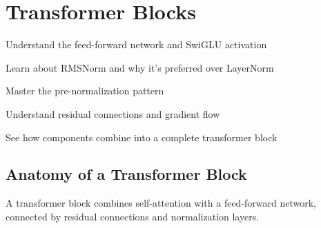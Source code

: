 \chapter{Transformer Blocks}
\label{ch:transformer-blocks}

\begin{objectives}
    \item Understand the feed-forward network and SwiGLU activation
    \item Learn about RMSNorm and why it's preferred over LayerNorm
    \item Master the pre-normalization pattern
    \item Understand residual connections and gradient flow
    \item See how components combine into a complete transformer block
\end{objectives}

\section{Anatomy of a Transformer Block}

A transformer block combines self-attention with a feed-forward network, connected by residual connections and normalization layers.

